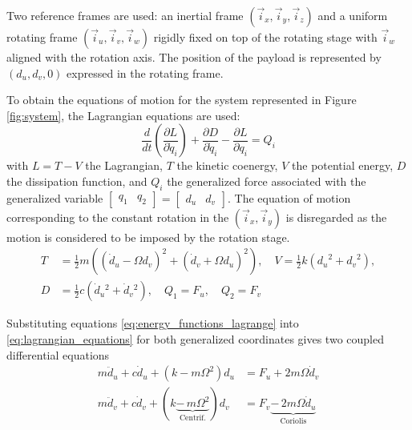\documentclass{ISMA_USD2020}
\begin{document}
Two reference frames are used: an inertial frame \((\vec{i}_x, \vec{i}_y, \vec{i}_z)\) and a uniform rotating frame \((\vec{i}_u, \vec{i}_v, \vec{i}_w)\) rigidly fixed on top of the rotating stage with \(\vec{i}_w\) aligned with the rotation axis.
The position of the payload is represented by \((d_u, d_v, 0)\) expressed in the rotating frame.

\par
To obtain the equations of motion for the system represented in Figure \ref{fig:system}, the Lagrangian equations are used:
\begin{equation}
\label{eq:lagrangian_equations}
  \frac{d}{dt} \left( \frac{\partial L}{\partial \dot{q}_i} \right) + \frac{\partial D}{\partial \dot{q}_i} - \frac{\partial L}{\partial q_i} = Q_i
\end{equation}
with \(L = T - V\) the Lagrangian, \(T\) the kinetic coenergy, \(V\) the potential energy, \(D\) the dissipation function, and \(Q_i\) the generalized force associated with the generalized variable \(\begin{bmatrix}q_1 & q_2\end{bmatrix} = \begin{bmatrix}d_u & d_v\end{bmatrix}\).
The equation of motion corresponding to the constant rotation in the \((\vec{i}_x, \vec{i}_y)\) is disregarded as the motion is considered to be imposed by the rotation stage.
\begin{equation}
\label{eq:energy_functions_lagrange}
  \begin{aligned}
    T & = \frac{1}{2} m \left( \left( \dot{d}_u - \Omega d_v \right)^2 + \left( \dot{d}_v + \Omega d_u \right)^2 \right), \quad V = \frac{1}{2} k \left( {d_u}^2 + {d_v}^2 \right),\\
    D &= \frac{1}{2} c \left( \dot{d}_u{}^2 + \dot{d}_v{}^2 \right), \quad Q_1 = F_u, \quad Q_2 = F_v
  \end{aligned}
\end{equation}

Substituting equations \eqref{eq:energy_functions_lagrange} into \eqref{eq:lagrangian_equations} for both generalized coordinates gives two coupled differential equations
\begin{subequations}
\label{eq:eom_coupled}
  \begin{align}
    m \ddot{d}_u + c \dot{d}_u + ( k - m \Omega^2 ) d_u &= F_u + 2 m \Omega \dot{d}_v \\
    m \ddot{d}_v + c \dot{d}_v + ( k \underbrace{-\,m \Omega^2}_{\text{Centrif.}} ) d_v &= F_v \underbrace{-\,2 m \Omega \dot{d}_u}_{\text{Coriolis}}
  \end{align}
\end{subequations}
\end{document}
